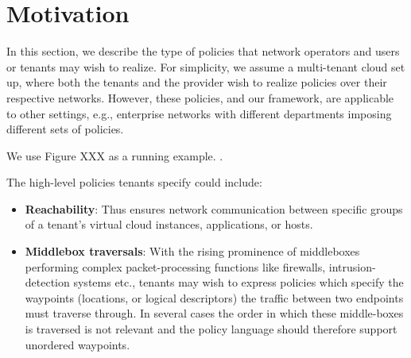 \section{Motivation}

In this section, we describe the type of
policies that network operators and users or tenants may wish to
realize. For simplicity, we assume a multi-tenant cloud set up, where
both the tenants and the provider wish to realize policies over their
respective networks. However, these policies, and our framework, are
applicable to other settings, e.g., enterprise networks with different
departments imposing different sets of policies.

We use Figure XXX as a running example. .



The high-level policies tenants specify could include:

\begin{itemize}
\item \textbf{Reachability}: Thus ensures network communication
  between specific groups of a tenant's virtual cloud instances,
  applications, or hosts. 
\item \textbf{Middlebox traversals}: With the rising prominence of
  middleboxes performing complex packet-processing functions like
  firewalls, intrusion-detection systems etc., tenants may wish to
  express policies which specify the waypoints (locations, or logical
  descriptors)  the traffic between two
  endpoints must traverse through.	  
    In several cases  the order in which these middle-boxes is traversed
    is not relevant and the policy language should therefore support unordered waypoints.
\end{itemize}

